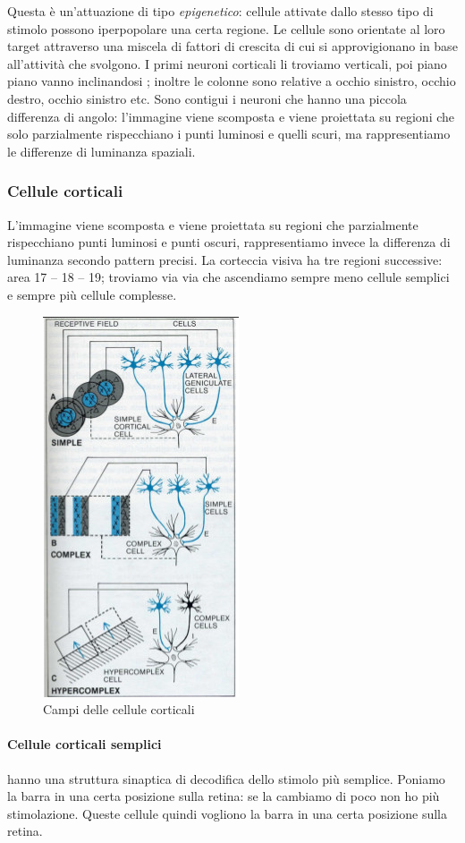 \documentclass[a4paper,12pt]{article}
\begin{document}
Questa è un'attuazione di tipo \emph{epigenetico}: cellule attivate dallo stesso tipo di stimolo possono iperpopolare una certa regione.
Le cellule sono orientate al loro target attraverso una miscela di fattori di crescita di cui si approvigionano in base all'attività che svolgono. I primi neuroni corticali li troviamo verticali, poi piano piano vanno inclinandosi ; inoltre le colonne sono relative a occhio sinistro, occhio destro, occhio sinistro etc.
Sono contigui i neuroni che hanno una piccola differenza di angolo: l'immagine viene scomposta e viene proiettata su regioni che solo parzialmente rispecchiano i punti luminosi e quelli scuri, ma rappresentiamo le differenze di luminanza spaziali. 

\subsubsection{Cellule corticali}
L'immagine viene scomposta e viene proiettata su regioni che parzialmente rispecchiano punti luminosi e punti oscuri, rappresentiamo invece la differenza di luminanza secondo pattern precisi. La corteccia visiva ha tre regioni successive: area 17 – 18 – 19; troviamo via via che ascendiamo sempre meno cellule semplici e sempre più cellule complesse.
\begin{figure}[H]
\centering
\includegraphics[scale=0.5]{immagine/corticali.jpg}
\caption{Campi delle cellule corticali}
\end{figure} 

\paragraph{Cellule corticali semplici}  
 hanno una struttura sinaptica di decodifica dello stimolo più semplice. Poniamo la barra in una certa posizione sulla retina: se la cambiamo di poco non ho più stimolazione. Queste cellule quindi vogliono la barra in una certa posizione sulla retina.
 
\end{document}
